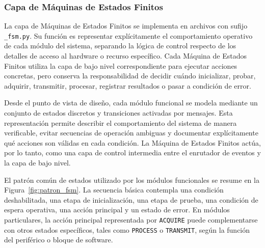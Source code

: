 \subsubsection{Capa de Máquinas de Estados Finitos}
\label{subsubsec:capa_maquinas_estados}

La capa de Máquinas de Estados Finitos se implementa en archivos con sufijo \texttt{\_fsm.py}. Su función es representar explícitamente el comportamiento operativo de cada módulo del sistema, separando la lógica de control respecto de los detalles de acceso al hardware o recurso específico. Cada Máquina de Estados Finitos utiliza la capa de bajo nivel correspondiente para ejecutar acciones concretas, pero conserva la responsabilidad de decidir cuándo inicializar, probar, adquirir, transmitir, procesar, registrar resultados o pasar a condición de error.

Desde el punto de vista de diseño, cada módulo funcional se modela mediante un conjunto de estados discretos y transiciones activadas por mensajes. Esta representación permite describir el comportamiento del sistema de manera verificable, evitar secuencias de operación ambiguas y documentar explícitamente qué acciones son válidas en cada condición. La Máquina de Estados Finitos actúa, por lo tanto, como una capa de control intermedia entre el enrutador de eventos y la capa de bajo nivel.

El patrón común de estados utilizado por los módulos funcionales se resume en la Figura~\ref{fig:patron_fsm}. La secuencia básica contempla una condición deshabilitada, una etapa de inicialización, una etapa de prueba, una condición de espera operativa, una acción principal y un estado de error. En módulos particulares, la acción principal representada por \texttt{ACQUIRE} puede complementarse con otros estados específicos, tales como \texttt{PROCESS} o \texttt{TRANSMIT}, según la función del periférico o bloque de software.

